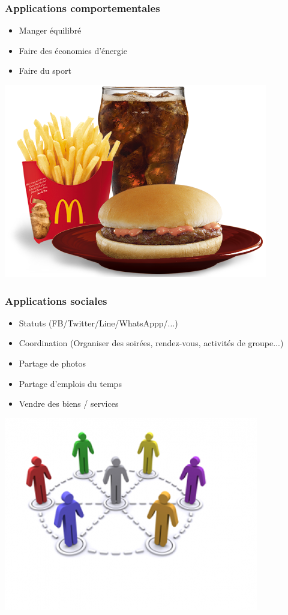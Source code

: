 \documentclass{beamer}
\begin{document}
\begin{frame}
\frametitle{Applications comportementales}
\begin{itemize}
		\item Manger équilibré
		\item Faire des économies d'énergie
		\item Faire du sport
\end{itemize}
\begin{center}
\includegraphics[scale=0.2]{burger_mcdo.png}
\end{center}
\end{frame}

\begin{frame}
\frametitle{Applications sociales}
\begin{itemize}
		\item Statuts (FB/Twitter/Line/WhatsAppp/...)
		\item Coordination (Organiser des soirées, rendez-vous, activités de groupe...)
		\item Partage de photos
		\item Partage d'emplois du temps
		\item Vendre des biens / services
\end{itemize}
\begin{center}
\includegraphics[scale=0.2]{social.png}
\end{center}
\end{frame}
\end{document}
